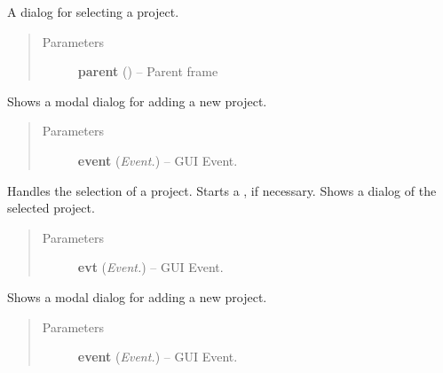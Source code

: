 \documentclass[letterpaper,10pt,english]{sphinxmanual}
\begin{document}
\begin{fulllineitems}
\label{api:wos.ProjectSelectDialog}
A dialog for selecting a project.
\begin{quote}\begin{description}
\item[{Parameters}] \leavevmode
\textbf{parent} () -- Parent frame

\end{description}\end{quote}

\begin{fulllineitems}
\label{api:wos.ProjectSelectDialog.AddEvent}
Shows a modal dialog for adding a new project.
\begin{quote}\begin{description}
\item[{Parameters}] \leavevmode
\textbf{event} (\emph{Event.}) -- GUI Event.

\end{description}\end{quote}

\end{fulllineitems}


\begin{fulllineitems}
\label{api:wos.ProjectSelectDialog.DelEvent}
Handles the selection of a project. Starts a {\hyperref[api:wos.CURRENT_PROJECT]{}}, if necessary. Shows a dialog of the selected project.
\begin{quote}\begin{description}
\item[{Parameters}] \leavevmode
\textbf{evt} (\emph{Event.}) -- GUI Event.

\end{description}\end{quote}

\end{fulllineitems}


\begin{fulllineitems}
\label{api:wos.ProjectSelectDialog.EditEvent}
Shows a modal dialog for adding a new project.
\begin{quote}\begin{description}
\item[{Parameters}] \leavevmode
\textbf{event} (\emph{Event.}) -- GUI Event.


\end{description}
\end{quote}
\end{fulllineitems}
\end{fulllineitems}
\end{document}
